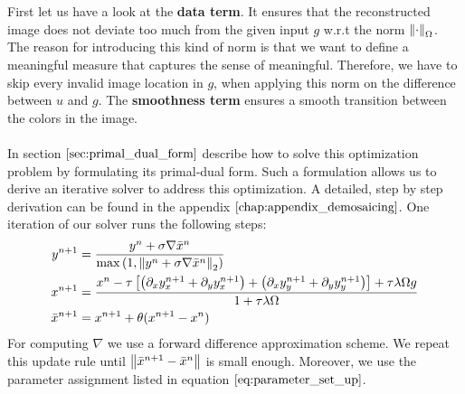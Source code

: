 First let us have a look at the \textbf{data term}. It ensures that the reconstructed image does not deviate too much from the given input $g$ w.r.t the norm $\left\lVert\cdot\right\rVert_\Omega$. The reason for introducing this kind of norm is that we want to define a meaningful measure that captures the sense of meaningful. Therefore, we have to skip every invalid image location in $g$, when applying this norm on the difference between $u$ and $g$. The \textbf{smoothness term} ensures a smooth transition between the colors in the image. \\ \\
In section $\ref{sec:primal_dual_form}$ describe how to solve this optimization problem by formulating its primal-dual form. Such a formulation allows us to derive an iterative solver to address this optimization. A detailed, step by step derivation can be found in the appendix $\ref{chap:appendix_demosaicing}$. One iteration of our solver runs the following steps:
\begin{equation}
\begin{aligned}
	y^{n+1} &= \frac{y^n + \sigma \nabla \bar{x}^{n}}{\max{\left(1,\left\lVert y^n + \sigma \nabla \bar{x}^{n}\right\rVert_2 \right)}} \nonumber \\
	x^{n+1} &= \frac{x^n - \tau \left[ \left( \partial_x y_{x}^{n+1} + \partial_y y_{x}^{n+1} \right) + \left( \partial_x y_{y}^{n+1} + \partial_y y_{y}^{n+1} \right) \right] +  \tau \lambda \Omega g}{1+\tau \lambda \Omega} \\
	\bar{x}^{n+1} &= x^{n+1} + \theta(x^{n+1} - x^n)
\end{aligned}
\end{equation}
For computing $\nabla$ we use a forward difference approximation scheme.
We repeat this update rule until $\left\lVert\bar{x}^{n+1} - \bar{x}^{n}\right\rVert$ is small enough. Moreover, we use the parameter assignment listed in equation $\ref{eq:parameter_set_up}$.

